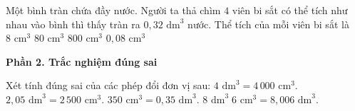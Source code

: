 \begin{ex} %
Một bình tràn chứa đầy nước. Người ta thả chìm $4$ viên bi sắt có thể tích như nhau vào bình thì thấy tràn ra $0{,}32\text{ dm}^3$ nước. Thể tích của mỗi viên bi sắt là
\choice
{$8\text{ cm}^3$}
{\True $80\text{ cm}^3$}
{$800\text{ cm}^3$}
{$0{,}08\text{ cm}^3$}
\end{ex}

\textbf{Phần 2. Trắc nghiệm đúng sai}

\begin{ex} %
Xét tính đúng sai của các phép đổi đơn vị sau:
\choiceTF
{\True $4\text{ dm}^3 = 4\,000\text{ cm}^3$.}
{$2{,}05\text{ dm}^3 = 2\,500\text{ cm}^3$.}
{\True $350\text{ cm}^3 = 0{,}35\text{ dm}^3$.}
{\True $8\text{ dm}^3\; 6\text{ cm}^3 = 8{,}006\text{ dm}^3$.}
\end{ex}


